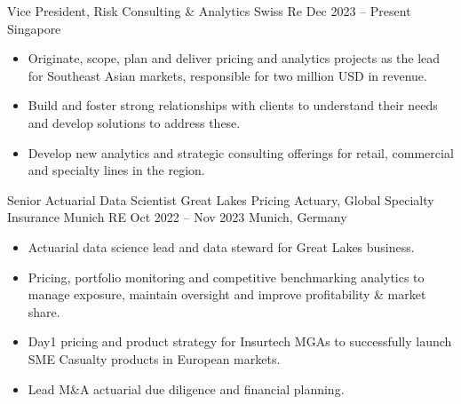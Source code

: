 \documentclass[a4paper,]{fortysecondscv}
\begin{document}
\begin{cvtable}%

    \vspace{\topsep}
    \cvitemoneblock
    {Vice President, Risk Consulting \& Analytics}
    {Swiss Re}
    {Dec 2023 -- Present}
    {Singapore}
    {
        \vspace{\topsep}
        \begin{itemize}[nosep, leftmargin=12pt , label={-}] %
            \item Originate, scope, plan and deliver pricing and analytics projects as the lead for Southeast Asian markets, responsible for two million USD in revenue.
            \item Build and foster strong relationships with clients to understand their needs and develop solutions to address these.
            \item Develop new analytics and strategic consulting offerings for retail, commercial and specialty lines in the region.
        \end{itemize}
    }

    \vspace{\topsep}
    \cvitemoneblockdouble
    {Senior Actuarial Data Scientist}
    {Great Lakes}
    {Pricing Actuary, Global Specialty Insurance}
    {Munich RE}
    {Oct 2022 -- Nov 2023}
    {Munich, Germany}
    {
        \begin{itemize}[nosep, leftmargin=12pt, label={-}] %
            \item Actuarial data science lead and data steward for Great Lakes business.
            \item Pricing, portfolio monitoring and competitive benchmarking analytics to manage exposure, maintain oversight and improve profitability \& market share.
            \item Day1 pricing and product strategy for Insurtech MGAs to successfully launch SME Casualty products in European markets.
            \item Lead M\&A actuarial due diligence and financial planning.
        \end{itemize}
    }


\end{cvtable}
\end{document}
